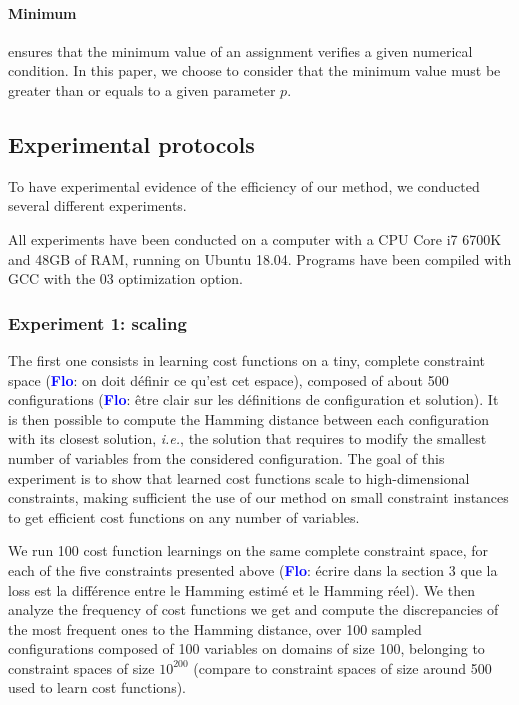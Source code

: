 \documentclass{article}
\newcommand{\ie}{\textit{i.e.}}
\newcommand{\flo}{\textcolor{blue}{\bf Flo}\xspace}
\begin{document}
\paragraph{Minimum} ensures that the minimum value of an assignment verifies a given numerical condition.  In this paper, we choose to consider that the minimum value must be greater than or equals to a given parameter $p$.

\subsection{Experimental protocols}

To have experimental evidence of the efficiency of our method, we conducted several different experiments.

All experiments have been conducted on a computer with a CPU Core i7 6700K and  48GB of RAM,  running on  Ubuntu 18.04. Programs have been compiled with GCC with the 03 optimization option.

\subsubsection{Experiment 1: scaling}

The first one consists in learning cost functions on a tiny, complete  constraint space  (\flo:  on doit  définir  ce  qu'est  cet espace), composed of about 500  configurations (\flo: être  clair sur les définitions de configuration et solution).  It is then possible to compute the  Hamming distance between each configuration with its closest solution,  \ie, the solution that requires to modify the smallest number of variables from the considered configuration. The goal of this experiment is to show that learned cost functions scale to high-dimensional constraints,  making sufficient the use of our method on small constraint instances to get efficient cost functions on any number of variables.

We run  100 cost function learnings on the same complete constraint space, for each of the five constraints presented above  (\flo: écrire dans  la section  3 que  la loss  est la  différence entre  le Hamming estimé et le Hamming réel). We then analyze the frequency of cost functions we get and compute the discrepancies of the most frequent ones to the Hamming distance, over  100 sampled configurations composed of  100  variables on domains of size  100, belonging to constraint  spaces of size  $10^{200}$  (compare to constraint spaces of size around 500 used to learn cost functions).
\end{document}

